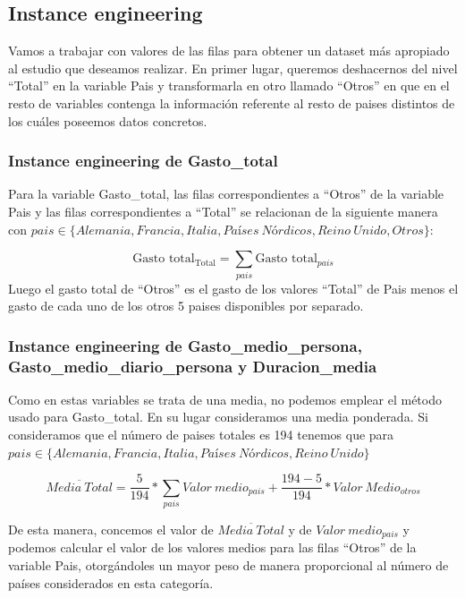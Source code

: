 \documentclass[data,article,submit,moreauthors,pdftex]{Definitions/mdpi}
\begin{document}
\subsection{Instance engineering}\label{instance-engineering}

Vamos a trabajar con valores de las filas para obtener un dataset más
apropiado al estudio que deseamos realizar. En primer lugar, queremos
deshacernos del nivel ``Total'' en la variable Pais y transformarla en
otro llamado ``Otros'' en que en el resto de variables contenga la
información referente al resto de paises distintos de los cuáles
poseemos datos concretos.

\subsubsection{Instance engineering de
Gasto\_total}\label{instance-engineering-de-gasto_total}

Para la variable Gasto\_total, las filas correspondientes a ``Otros'' de
la variable Pais y las filas correspondientes a ``Total'' se relacionan
de la siguiente manera con
\(pais\in\{Alemania, Francia,Italia, Países\ Nórdicos, Reino\ Unido, Otros\}\):

\[ \text{Gasto total}_{\text{Total}} = \sum_{pais}{\text{Gasto total}_{pais}}\]
Luego el gasto total de ``Otros'' es el gasto de los valores ``Total''
de Pais menos el gasto de cada uno de los otros 5 paises disponibles por
separado.

\subsubsection{Instance engineering de Gasto\_medio\_persona,
Gasto\_medio\_diario\_persona y
Duracion\_media}\label{instance-engineering-de-gasto_medio_persona-gasto_medio_diario_persona-y-duracion_media}

Como en estas variables se trata de una media, no podemos emplear el
método usado para Gasto\_total. En su lugar consideramos una media
ponderada. Si consideramos que el número de paises totales es 194
tenemos que para
\(pais \in \{Alemania, Francia,Italia, Países\ Nórdicos, Reino\ Unido\}\)

\[
 \overline{Media\ Total} = \frac{5}{194}*\sum_{pais}{Valor\ medio}_{pais} + \frac{194-5}{194}*Valor \ Medio_{otros}
\]

De esta manera, concemos el valor de \(\overline{Media\ Total}\) y de
\({Valor\ medio}_{pais}\) y podemos calcular el valor de los valores
medios para las filas ``Otros'' de la variable Pais, otorgándoles un
mayor peso de manera proporcional al número de países considerados en
esta categoría.
\end{document}
